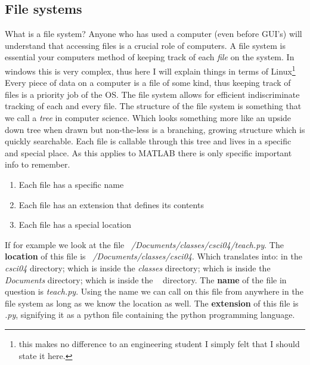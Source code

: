 \documentclass[12pt]{article}
\begin{document}
		\subsection{File systems}
			What is a file system?
			Anyone who has used a computer (even before GUI's) will understand that accessing files is a crucial role of computers.
			A file system is essential your computers method of keeping track of each \textit{file} on the system.
			In windows this is very complex,
				thus here I will explain things in terms of Linux\footnote{
				this makes no difference to an engineering student I simply felt that I should state it here.}
			Every piece of data on a computer is a file of some kind,
				thus keeping track of files is a priority job of the OS.
			The file system allows for efficient indiscriminate tracking of each and every file.
			The structure of the file system is something that we call a \textit{tree} in computer science.
			Which looks something more like an upside down tree when drawn but non-the-less is a branching,
				growing structure which is quickly searchable.
			Each file is callable through this tree and lives in a specific and special place.
			As this applies to MATLAB there is only specific important info to remember.
			\begin{enumerate}
				\item Each file has a specific name
				\item Each file has an extension that defines its contents
				\item Each file has a special location
			\end{enumerate}
			If for example we look at the file \textit{~/Documents/classes/csci04/teach.py}.
			The \textbf{location} of this file is \textit{~/Documents/classes/csci04}.
			Which translates into: in the \textit{csci04} directory;
				which is inside the \textit{classes} directory;
				which is inside the \textit{Documents} directory;
				which is inside the \textit{~} directory.
			The \textbf{name} of the file in question is \textit{teach.py}.
			Using the name we can call on this file from anywhere in the file system as long as we know the location as well.
			The \textbf{extension} of this file is \textit{.py},
				signifying it as a python file containing the python programming language.
\end{document}
